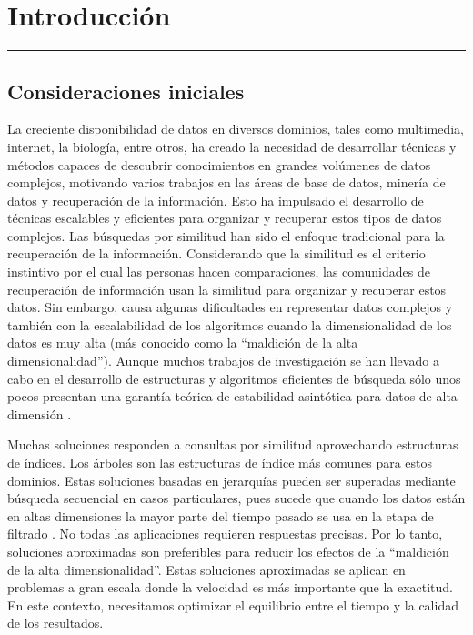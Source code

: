 \setcounter{equation}{0}
\chapter{Introducción}
\hrule \bigskip \vspace*{1cm}

\section{Consideraciones iniciales}

La creciente disponibilidad de datos en diversos dominios, tales  como multimedia, internet, la biología, entre  otros,  ha creado  la necesidad  de desarrollar  técnicas y métodos capaces de descubrir  conocimientos  en grandes volúmenes de datos complejos, motivando  varios  trabajos en las áreas  de base  de datos,  minería de datos  y recuperación  de la información. Esto ha impulsado el desarrollo de técnicas escalables y eficientes para organizar y recuperar estos tipos de datos complejos. Las búsquedas por similitud han sido el enfoque tradicional para la recuperación de la información. Considerando que la similitud es el criterio instintivo por el cual las personas hacen comparaciones, las comunidades de recuperación de información usan la similitud para organizar y recuperar estos datos.    Sin embargo, causa algunas dificultades en representar datos complejos y también con la escalabilidad de los algoritmos cuando la dimensionalidad de los datos es muy alta (más conocido como la ``maldición de la alta dimensionalidad''). Aunque muchos trabajos de investigación se han llevado a cabo en el desarrollo de estructuras y algoritmos eficientes de búsqueda sólo unos pocos presentan una garantía teórica de estabilidad asintótica para datos de alta dimensión \cite{5459466,CiteULike:7399806}.

Muchas soluciones responden a consultas por similitud aprovechando estructuras de índices. Los árboles son las estructuras de índice más comunes para estos dominios. Estas soluciones basadas en jerarquías pueden ser superadas mediante búsqueda secuencial en casos particulares, pues sucede que cuando los datos están en altas  dimensiones  la mayor parte del tiempo pasado se usa en la etapa de filtrado  \cite{WhatsWrong}. No todas las aplicaciones requieren respuestas precisas. Por lo tanto,  soluciones aproximadas son preferibles para reducir los efectos de la ``maldición de la alta dimensionalidad''. Estas soluciones aproximadas se aplican en problemas a gran escala donde la velocidad es más importante que la exactitud. En este contexto, necesitamos optimizar el equilibrio entre el tiempo y la calidad de los resultados.

